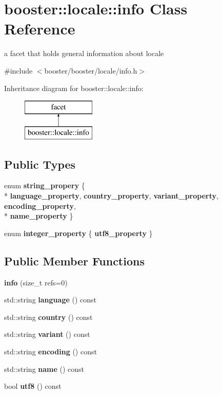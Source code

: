 \section{booster\+:\+:locale\+:\+:info Class Reference}
\label{classbooster_1_1locale_1_1info}


a facet that holds general information about locale  




{\ttfamily \#include $<$booster/booster/locale/info.\+h$>$}

Inheritance diagram for booster\+:\+:locale\+:\+:info\+:\begin{figure}[H]
\begin{center}
\leavevmode
\includegraphics[height=2.000000cm]{classbooster_1_1locale_1_1info}
\end{center}
\end{figure}
\subsection*{Public Types}
\begin{DoxyCompactItemize}
\item 
enum {\bf string\+\_\+propery} \{ \\*
{\bf language\+\_\+property}, 
{\bf country\+\_\+property}, 
{\bf variant\+\_\+property}, 
{\bf encoding\+\_\+property}, 
\\*
{\bf name\+\_\+property}
 \}
\item 
enum {\bf integer\+\_\+property} \{ {\bf utf8\+\_\+property}
 \}
\end{DoxyCompactItemize}
\subsection*{Public Member Functions}
\begin{DoxyCompactItemize}
\item 
{\bf info} (size\+\_\+t refs=0)
\item 
std\+::string {\bf language} () const 
\item 
std\+::string {\bf country} () const 
\item 
std\+::string {\bf variant} () const 
\item 
std\+::string {\bf encoding} () const 
\item 
std\+::string {\bf name} () const 
\item 
bool {\bf utf8} () const 
\end{DoxyCompactItemize}
